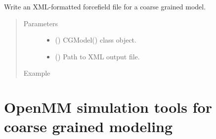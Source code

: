\documentclass[letterpaper,12pt,english,openany,oneside]{sphinxmanual}
\begin{document}
\begin{fulllineitems}
\label{\detokenize{build:build.cg_build.write_xml_file}}
Write an XML-formatted forcefield file for a coarse grained model.
\begin{quote}\begin{description}
\item[{Parameters}] \leavevmode\begin{itemize}
\item {} 
 () \textendash{} CGModel() class object.

\item {} 
 () \textendash{} Path to XML output file.

\end{itemize}

\item[{Example}] \leavevmode
\end{description}\end{quote}

\begin{sphinxVerbatim}[commandchars=\\\{\}]
   
  
  
\end{sphinxVerbatim}

\end{fulllineitems}



\chapter{OpenMM simulation tools for coarse grained modeling}
\label{\detokenize{simulation:openmm-simulation-tools-for-coarse-grained-modeling}}\label{\detokenize{simulation::doc}}
\end{document}

